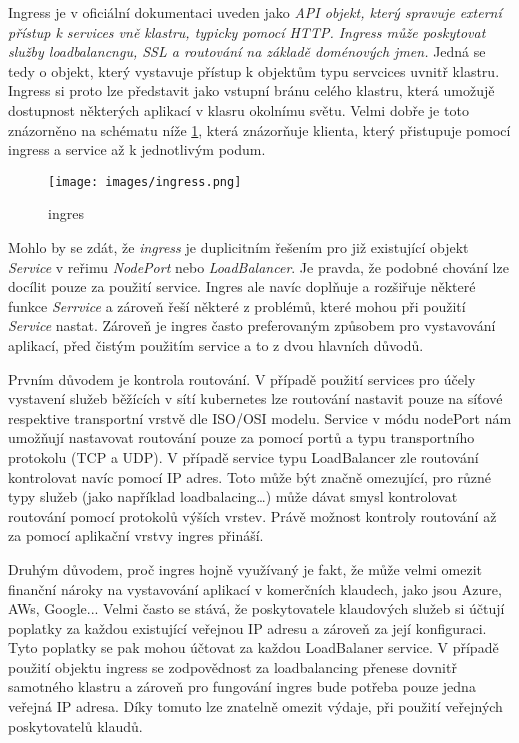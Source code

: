 Ingress je v oficiální dokumentaci uveden jako \textit{API objekt, který spravuje externí přístup k services vně klastru, typicky pomocí HTTP. Ingress může poskytovat služby loadbalancngu, SSL a routování na základě doménových jmen.} \cite{thekubernetesauthors_2023_ingress} Jedná se tedy o objekt, který vystavuje přístup k objektům typu servcices uvnitř klastru. Ingress si proto lze představit jako vstupní bránu celého klastru, která umožujě dostupnost některých aplikací v klasru okolnímu světu. Velmi dobře je toto znázorněno na schématu níže \ref{fig:ingres}, která znázorňuje klienta, který přistupuje pomocí ingress a service až k jednotlivým podum. 

\begin{figure}[!ht]
    \centering
    \texttt{[image: images/ingress.png]}
    \caption{ingres}
    \label{fig:ingres}
    \cite{thekubernetesauthors_2023_ingressdiagram}
\end{figure}

Mohlo by se zdát, že \textit{ingress} je duplicitním řešením pro již existující objekt \textit{Service} v reřimu \textit{NodePort} nebo \textit{LoadBalancer}. Je pravda, že podobné chování lze docílit pouze za použití service. Ingres ale navíc doplňuje a rozšiřuje některé funkce \textit{Serrvice} a zároveň řeší některé z problémů, které mohou při použití \textit{Service} nastat. Zároveň je ingres často preferovaným způsobem pro vystavování aplikací, před čistým použitím service a to z dvou hlavních důvodů.

Prvním důvodem je kontrola routování. V případě použití services pro účely vystavení služeb běžících v sítí kubernetes lze routování nastavit pouze na síťové respektive transportní vrstvě dle ISO/OSI modelu. Service v módu nodePort nám umožňují nastavovat routování pouze za pomocí portů a typu transportního protokolu (TCP a UDP). V případě service typu LoadBalancer zle routování kontrolovat navíc pomocí IP adres. Toto může být značně omezující, pro různé typy služeb (jako například loadbalacing\ldots) může dávat smysl kontrolovat routování pomocí protokolů výších vrstev. Právě možnost kontroly routování až za pomocí aplikační vrstvy ingres přináší.

Druhým důvodem, proč ingres hojně využívaný je fakt, že může velmi omezit finanční nároky na vystavování aplikací v komerčních klaudech, jako jsou Azure, AWs, Google... Velmi často se stává, že poskytovatele klaudových služeb si účtují poplatky za každou existující veřejnou IP adresu a zároveň za její konfiguraci. Tyto poplatky se pak mohou účtovat za každou LoadBalaner service. V případě použití objektu ingress se zodpovědnost za loadbalancing přenese dovnitř samotného klastru a zároveň pro fungování ingres bude potřeba pouze jedna veřejná IP adresa. Díky tomuto lze znatelně omezit výdaje, při použití veřejných poskytovatelů klaudů.

